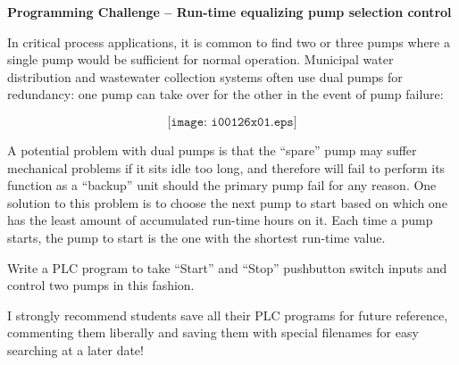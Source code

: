 

\noindent
{\bf Programming Challenge -- Run-time equalizing pump selection control} 

\vskip 10pt

In critical process applications, it is common to find two or three pumps where a single pump would be sufficient for normal operation.  Municipal water distribution and wastewater collection systems often use dual pumps for redundancy: one pump can take over for the other in the event of pump failure:

$$\texttt{[image: i00126x01.eps]}$$

A potential problem with dual pumps is that the ``spare'' pump may suffer mechanical problems if it sits idle too long, and therefore will fail to perform its function as a ``backup'' unit should the primary pump fail for any reason.  One solution to this problem is to choose the next pump to start based on which one has the least amount of accumulated run-time hours on it.  Each time a pump starts, the pump to start is the one with the shortest run-time value.

\vskip 10pt

Write a PLC program to take ``Start'' and ``Stop'' pushbutton switch inputs and control two pumps in this fashion.




\vfil 

\eject













I strongly recommend students save all their PLC programs for future reference, commenting them liberally and saving them with special filenames for easy searching at a later date!

